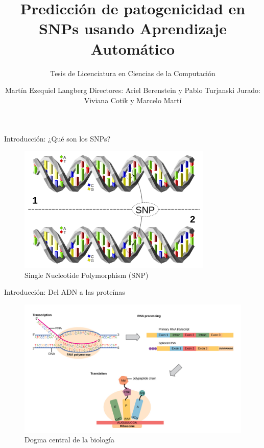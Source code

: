 \documentclass[
  spanish,
  ignorenonframetext,
]{beamer}
\title{Predicción de patogenicidad en SNPs usando Aprendizaje Automático}
\subtitle{Tesis de Licenciatura en Ciencias de la Computación}
\author{Martín Ezequiel Langberg \newline Directores: Ariel Berenstein y Pablo
Turjanski \newline Jurado: Viviana Cotik y Marcelo Martí}
\date{}
\institute{Departamento de Computación, FCEyN, UBA}
\begin{document}
\frame{\titlepage}

\begin{frame}{Introducción: ¿Qué son los SNPs?}
\protect\hypertarget{introducciuxf3n-quuxe9-son-los-snps}{}

\begin{figure}
\centering
\includegraphics[width=3.64583in,height=\textheight]{Dna-SNP.svg.png}
\caption{Single Nucleotide Polymorphism (SNP)}
\end{figure}


\end{frame}

\begin{frame}{Introducción: Del ADN a las proteínas}
\protect\hypertarget{introducciuxf3n-del-adn-a-las-proteuxednas}{}

\begin{figure}
\centering
\includegraphics[width=4.6875in,height=\textheight]{dogma.png}
\caption{Dogma central de la biología}
\end{figure}

\end{frame}
\end{document}
